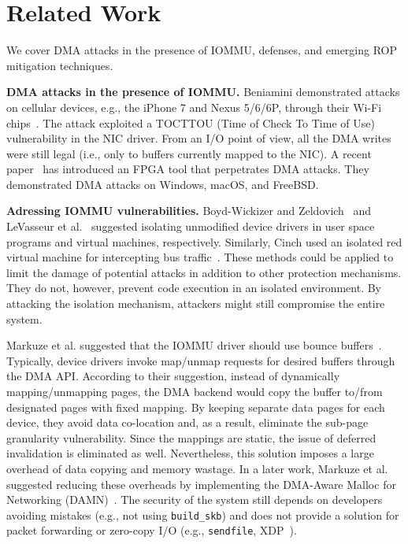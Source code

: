 \section{Related Work}
We cover DMA attacks in the presence of IOMMU, defenses, and emerging ROP mitigation techniques.

\smallskip
\noindent\textbf{DMA attacks in the presence of IOMMU.}
Beniamini demonstrated attacks on cellular devices, e.g., the iPhone 7 and Nexus 5/6/6P, through their Wi-Fi chips~\cite{Ben17a, Ben17b}. 
The attack exploited a TOCTTOU (Time of Check To Time of Use) vulnerability in the NIC driver. From an I/O point of view, all the DMA writes were still legal (i.e., only to buffers currently mapped to the NIC). A recent paper~\cite{thunder} has introduced an FPGA tool that perpetrates DMA attacks. They demonstrated \simple DMA attacks on Windows, macOS, and FreeBSD.

\smallskip
\noindent\textbf{Adressing IOMMU vulnerabilities.}
Boyd-Wickizer and Zeldovich~\cite{BWZ10} and LeVasseur et al.~\cite{LUSG04} suggested isolating unmodified device drivers in user space programs and virtual machines, respectively. Similarly, Cinch used an isolated red virtual machine for intercepting bus traffic~\cite{AWH16}. These methods could be applied to limit the damage of potential attacks in addition to other protection mechanisms. They do not, however, prevent code execution in an isolated environment. By attacking the isolation mechanism, attackers might still compromise the entire system.

Markuze et al. suggested that the IOMMU driver should use bounce buffers~\cite{MMT16}. Typically, device drivers invoke map/unmap requests for desired buffers through the DMA API. According to their suggestion, instead of dynamically mapping/unmapping pages, the DMA backend would copy the buffer to/from designated pages with fixed mapping. By keeping separate data pages for each device, they avoid data co-location and, as a result, eliminate the sub-page granularity vulnerability. Since the mappings are static, the issue of deferred invalidation is eliminated as well. 
%
Nevertheless, this solution imposes a large overhead of data copying and memory wastage. In a later work, Markuze et al. suggested reducing these overheads by implementing the DMA-Aware Malloc for Networking (DAMN)~\cite{MSMT18}. The security of the system still depends on developers avoiding mistakes (e.g., not using \texttt{build\_skb}) and does not provide a solution for packet forwarding or zero-copy I/O (e.g., \texttt{sendfile}, XDP~\cite{xdp}). %

